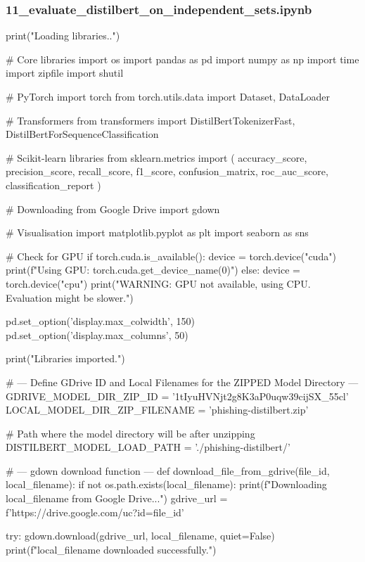 \subsubsection*{11\_evaluate\_distilbert\_on\_independent\_sets.ipynb}

\begin{ffcode}
print("Loading libraries..")

# Core libraries
import os
import pandas as pd
import numpy as np
import time
import zipfile
import shutil

# PyTorch
import torch
from torch.utils.data import Dataset, DataLoader

# Transformers
from transformers import DistilBertTokenizerFast, DistilBertForSequenceClassification

# Scikit-learn libraries
from sklearn.metrics import (
    accuracy_score,
    precision_score,
    recall_score,
    f1_score,
    confusion_matrix,
    roc_auc_score,
    classification_report
)

# Downloading from Google Drive
import gdown

# Visualisation
import matplotlib.pyplot as plt
import seaborn as sns

# Check for GPU
if torch.cuda.is_available():
    device = torch.device("cuda")
    print(f"Using GPU: {torch.cuda.get_device_name(0)}")
else:
    device = torch.device("cpu")
    print("WARNING: GPU not available, using CPU. Evaluation might be slower.")

pd.set_option('display.max_colwidth', 150)
pd.set_option('display.max_columns', 50)

print("Libraries imported.")

# --- Define GDrive ID and Local Filenames for the ZIPPED Model Directory ---
GDRIVE_MODEL_DIR_ZIP_ID = '1tIyuHVNjt2g8K3aP0uqw39cijSX_55cl'
LOCAL_MODEL_DIR_ZIP_FILENAME = 'phishing-distilbert.zip'

# Path where the model directory will be after unzipping
DISTILBERT_MODEL_LOAD_PATH = './phishing-distilbert/'

# --- gdown download function ---
def download_file_from_gdrive(file_id, local_filename):
    if not os.path.exists(local_filename):
        print(f"Downloading {local_filename} from Google Drive...")
        gdrive_url = f'https://drive.google.com/uc?id={file_id}'

        try:
            gdown.download(gdrive_url, local_filename, quiet=False)
            print(f"{local_filename} downloaded successfully.")


\end{ffcode}
